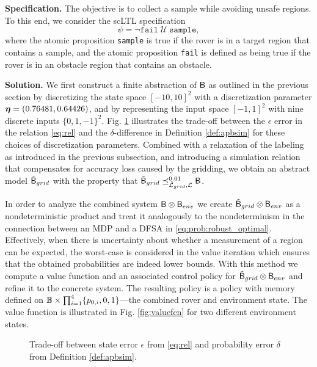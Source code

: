\documentclass{ifacconf}
\begin{document}
\textbf{Specification.} The objective is to collect a sample while avoiding unsafe regions. To this end, we consider the scLTL specification
\begin{equation}
  \psi =\lnot \texttt{fail} \; \mathcal {U} \; \texttt{sample},
\end{equation}
where the atomic proposition \texttt{sample} is true if the rover is in a target region that contains a sample, and the atomic proposition \texttt{fail} is defined as being true if the rover is in an obstacle region that contains an obstacle.


\textbf{Solution.} We first construct a finite abstraction of $\mathsf{B}$ as outlined in the previous section by discretizing the state space $[-10, 10]^2$ with a discretization parameter ${\boldsymbol{\eta}} = (0.76481, 0.64426)$, and by representing the input space $[-1,1]^2$ with nine discrete inputs $\{0, 1, -1\}^2$. Fig.  \ref{fig:tradeoff} illustrates the trade-off between the $\epsilon$ error in the relation \eqref{eq:rel} and the $\delta$-difference in Definition \ref{def:apbsim} for these choices of discretization parameters. Combined with a relaxation of the labeling as introduced in the previous subsection, and introducing a simulation relation that compensates for accuracy loss caused by the gridding, we obtain an abstract model $\tilde {\mathsf{B}}_{grid}$ with the property that $\tilde {\mathsf{B}}_{grid}\preceq^{0.01}_{\tilde{\mathcal{L}}_{grid},\mathcal{L}} \mathsf{B} $.

In order to analyze the combined system $\mathsf{B} \otimes \mathsf{B}_{env}$ we create $\tilde {\mathsf{B}}_{grid} \otimes \mathsf{B}_{env}$ as a nondeterministic product and treat it analogously to the nondeterminism in the connection between an MDP and a DFSA in \eqref{eq:prob:robust_optimal}. Effectively, when there is uncertainty about whether a measurement of a region can be expected, the worst-case is considered in the value iteration which ensures that the obtained probabilities are indeed lower bounds. With this method we compute a value function and an associated control policy for $\tilde {\mathsf{B}}_{grid} \otimes \mathsf{B}_{env}$ and refine it to the concrete system. The resulting policy is a policy with memory defined on $\mathbb{B} \times \prod_{i=1}^4 \{ p_{0,i}, 0, 1 \}$---the combined rover and environment state. The value function is illustrated in Fig. \ref{fig:valuefcn} for two different environment states.

\begin{figure}
  \footnotesize
   
  \caption{Trade-off between state error $\epsilon$ from \eqref{eq:rel} and probability error $\delta$ from Definition \ref{def:apbsim}.}
  \label{fig:tradeoff}
\end{figure}
\end{document}
